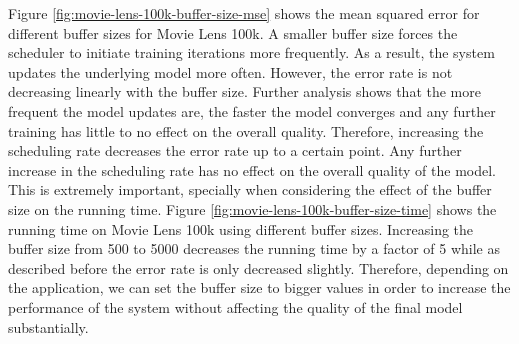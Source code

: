 \documentclass{vldb}
\begin{document}
Figure \ref{fig:movie-lens-100k-buffer-size-mse} shows the mean squared error for different buffer sizes for Movie Lens 100k. 
A smaller buffer size forces the scheduler to initiate training iterations more frequently.
As a result, the system updates the underlying model more often.
However, the error rate is not decreasing linearly with the buffer size.
Further analysis shows that the more frequent the model updates are, the faster the model converges and any further training has little to no effect on the overall quality.
Therefore, increasing the scheduling rate decreases the error rate up to a certain point.
Any further increase in the scheduling rate has no effect on the overall quality of the model.
This is extremely important, specially when considering the effect of the buffer size on the running time.
Figure \ref{fig:movie-lens-100k-buffer-size-time} shows the running time on Movie Lens 100k using different buffer sizes. 
Increasing the buffer size from 500 to 5000 decreases the running time by a factor of 5 while as described before the error rate is only decreased slightly.
Therefore, depending on the application, we can set the buffer size to bigger values in order to increase the performance of the system without affecting the quality of the final model substantially.
\end{document}
